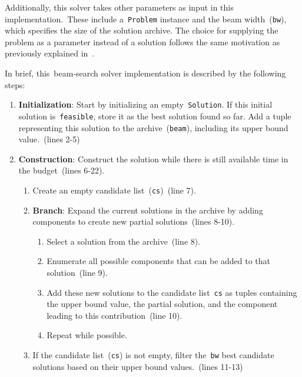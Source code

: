 Additionally, this solver takes other parameters as input in this
implementation.~These include a~\texttt{Problem} instance and the beam
width~(\texttt{bw}), which specifies the size of the solution archive. The
choice for supplying the problem as a parameter instead of a solution follows
the same motivation as previously explained
in~.



In brief, this~\acrshort{beam-search} solver implementation is described by the
following steps:

\begin{enumerate}
  \item \textbf{Initialization}: Start by initializing an empty~\texttt{Solution}. If
        this initial solution is~\texttt{feasible}, store it as the best solution found so far.
        Add a tuple representing this solution to the archive~(\texttt{beam}), including its
        upper bound value.~(lines 2-5)
  \item \textbf{Construction}: Construct the solution while there is still available time in the budget~(lines 6-22).
        \begin{enumerate}
          \item Create an empty candidate list~(\texttt{cs})~(line 7).
          \item \textbf{Branch}: Expand the current solutions in the archive by adding
                components to create new partial solutions~(lines 8-10).
                \begin{enumerate}
                  \item Select a solution from the archive~(line 8).
                  \item Enumerate all possible components that can be added to that solution~(line 9).
                  \item Add these new solutions to the candidate list~\texttt{cs} as tuples containing
                        the upper bound value, the partial solution, and the component leading to
                        this contribution~(line 10).
                  \item Repeat while possible.
                \end{enumerate}
          \item If the candidate list~(\texttt{cs}) is not empty, filter the~\texttt{bw} best
                candidate solutions based on their upper bound values.~(lines 11-13)

\end{enumerate}
\end{enumerate}
